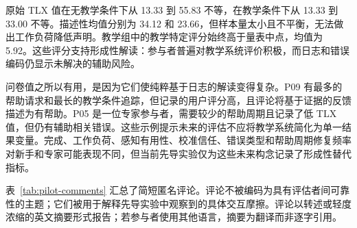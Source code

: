\begin{table}[htbp]
\centering
\caption{排除 P02 后的试验后问卷摘要。信心、教学评分和用户评分使用记录的 1--7 响应量表；原始 TLX 报告为非加权的原始工作负荷平均。}
\label{tab:pilot-questionnaire}
\small
{}
\end{table}

原始 TLX 值在无教学条件下从 13.33 到 55.83 不等，在教学条件下从 13.33 到 33.00 不等。描述性均值分别为 34.12 和 23.66，但样本量太小且不平衡，无法做出工作负荷降低声明。教学组中的教学特定评分始终高于量表中点，均值为 5.92。这些评分支持形成性解读：参与者普遍对教学系统评价积极，而日志和错误编码仍显示未解决的辅助风险。

问卷值之所以有用，是因为它们使纯粹基于日志的解读变得复杂。P09 有最多的帮助请求和最长的教学条件追踪，但记录的用户评分高，且评论将基于证据的反馈描述为有帮助。P05 是一位专家参与者，需要较少的帮助周期且记录了低 TLX 值，但仍有辅助相关错误。这些示例提示未来的评估不应将教学系统简化为单一结果变量。完成、工作负荷、感知有用性、校准信任、错误类型和帮助周期修复频率对新手和专家可能表现不同，但当前先导实验仅为这些未来构念记录了形成性替代指标。

表~\ref{tab:pilot-comments} 汇总了简短匿名评论。评论不被编码为具有评估者间可靠性的主题；它们被用于解释先导实验中观察到的具体交互摩擦。评论以转述或轻度浓缩的英文摘要形式报告；若参与者使用其他语言，摘要为翻译而非逐字引用。

